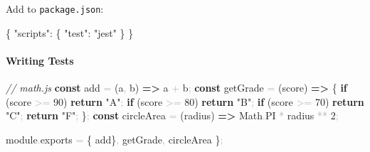 \documentclass[
  justified,
  openright,
]{tufte-book}
\let\subsection\paragraph
\let\paragraph\paragraph
\newcommand{\KeywordTok}[1]{\textcolor{CodeKeyword}{\textbf{#1}}}  %
\newcommand{\StringTok}[1]{\textcolor{CodeString}{#1}}              %
\newcommand{\CommentTok}[1]{\textcolor{CodeComment}{\textit{#1}}}  %
\newcommand{\CodeNumTok}[1]{\textcolor{CodeNumber}{#1}}             %
\newcommand{\CodeFuncTok}[1]{\textcolor{CodeKeyword}{#1}}           %
\newcommand{\CodeTypeTok}[1]{\textcolor{CodeType}{#1}}              %
\newcommand{\OperatorTok}[1]{\textcolor{DarkGray}{#1}}              %
\newenvironment{Shaded}{%
  \begin{mdframed}[style=TufteCode]%
}{%
  \end{mdframed}%
}
\let\subsection\paragraph
\let\paragraph\paragraph
\begin{document}
Add to \texttt{package.json}:

\begin{Shaded}
\begin{Highlighting}[]
\CodeFuncTok{\{}
  \CodeTypeTok{"scripts"}\CodeFuncTok{:} \CodeFuncTok{\{}
    \CodeTypeTok{"test"}\CodeFuncTok{:} \StringTok{"jest"}
  \CodeFuncTok{\}}
\CodeFuncTok{\}}
\end{Highlighting}
\end{Shaded}

\subsection{Writing Tests}\label{writing-tests}

\begin{Shaded}
\begin{Highlighting}[]
\CommentTok{// math.js}
\KeywordTok{const} add \OperatorTok{=} (a\OperatorTok{,} b) \KeywordTok{=\textgreater{}} a \OperatorTok{+} b\OperatorTok{;}
\KeywordTok{const} getGrade \OperatorTok{=} (score) \KeywordTok{=\textgreater{}} \{
  \KeywordTok{if} (score \OperatorTok{\textgreater{}=} \CodeNumTok{90}) \KeywordTok{return} \StringTok{"A"}\OperatorTok{;}
  \KeywordTok{if} (score \OperatorTok{\textgreater{}=} \CodeNumTok{80}) \KeywordTok{return} \StringTok{"B"}\OperatorTok{;}
  \KeywordTok{if} (score \OperatorTok{\textgreater{}=} \CodeNumTok{70}) \KeywordTok{return} \StringTok{"C"}\OperatorTok{;}
  \KeywordTok{return} \StringTok{"F"}\OperatorTok{;}
\}\OperatorTok{;}
\KeywordTok{const} circleArea \OperatorTok{=} (radius) \KeywordTok{=\textgreater{}} Math\OperatorTok{.}\CodeNumTok{PI} \OperatorTok{*} radius \OperatorTok{**} \CodeNumTok{2}\OperatorTok{;}
 
module\OperatorTok{.}\CodeTypeTok{exports} \OperatorTok{=} \{ add\}\OperatorTok{,} getGrade\OperatorTok{,} circleArea \}\OperatorTok{;}
\end{Highlighting}
\end{Shaded}
\end{document}
